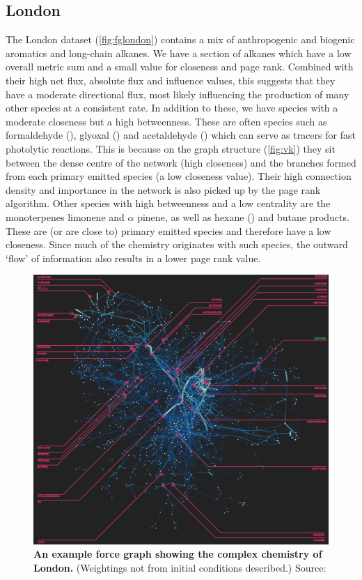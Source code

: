 \subsection*{London}
The London dataset (\autoref{fig:fglondon}) contains a mix of anthropogenic and biogenic aromatics and long-chain alkanes. We have a section of alkanes which have a low overall metric sum and a small value for closeness and page rank. Combined with their high net flux, absolute flux and influence values, this suggests that they have a moderate directional flux, most likely influencing the production of many other species at a consistent rate. In addition to these, we have species with a moderate closeness but a high betweenness. These are often species such as formaldehyde (), glyoxal () and acetaldehyde () which can serve as tracers for fast photolytic reactions. This is because on the graph structure (\autoref{fig:vk}) they sit between the dense centre of the network (high closeness) and the branches formed from each primary emitted species (a low closeness value). Their high connection density and importance in the network is also picked up by the page rank algorithm. Other species with high betweenness and a low centrality are the monoterpenes limonene and $\alpha$ pinene, as well as hexane () and butane products. These are (or are close to) primary emitted species and therefore have a low closeness. Since much of the chemistry originates with such species, the outward `flow' of information also results in a lower page rank value. 

\begin{figure}[H]
     \centering
         \includegraphics[width=.95\textwidth]{figures/lewis.png}
        \caption{ \textbf{An example force graph showing the complex chemistry of London.} (Weightings not from initial conditions described.) Source: \citep{science}  }
        \label{fig:fglondon}
\end{figure}




